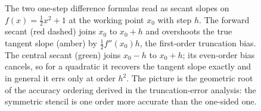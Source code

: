 \begin{figure}[ht]
\caption[Forward and central differences as secant slopes]{The two
one-step difference formulas read as secant slopes on
$f(x) = \tfrac{1}{2}x^{2} + 1$ at the working point $x_{0}$ with step
$h$. The forward secant (red dashed) joins $x_{0}$ to $x_{0}+h$ and
overshoots the true tangent slope (amber) by $\tfrac{1}{2}f''(x_{0})h$,
the first-order truncation bias. The central secant (green) joins
$x_{0}-h$ to $x_{0}+h$; its even-order bias cancels, so for a quadratic
it recovers the tangent slope exactly and in general it errs only at
order $h^{2}$. The picture is the geometric root of the accuracy
ordering derived in the truncation-error analysis: the symmetric
stencil is one order more accurate than the one-sided one.}
\label{fig:vol02:ch05:forward-central-error}
\end{figure}
